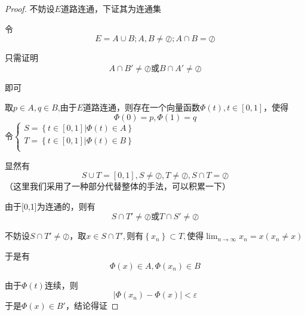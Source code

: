 \documentclass[lang=cn,10pt]{elegantbook}
\begin{document}
	\begin{proof}
		
		不妨设$E$道路连通，下证其为连通集
		
		令\begin{equation*}
			E=A\cup B;A,B\ne \oslash ;A\cap B=\oslash 
		\end{equation*}
		
		只需证明
		\begin{equation*}
			A\cap B'\ne\oslash\text{或}B\cap A'\ne\oslash
		\end{equation*}
		
		即可
		
		取$p\in A,q\in B$,由于$E$道路连通，则存在一个向量函数$\Phi \left( t \right) ,t\in \left[ 0,1 \right] $，使得
		\begin{equation*}
			\Phi \left( 0 \right)=p,\Phi \left( 1 \right)=q
		\end{equation*}
		令$\begin{cases}
			S=\left\{ t\in \left[ 0,1 \right] |\Phi \left( t \right) \in A \right\}\\
			T=\left\{ t\in \left[ 0,1 \right] |\Phi \left( t \right) \in B \right\}\\
		\end{cases}$
		
		显然有
		\begin{equation*}
			S\cup T=\left[ 0,1 \right] ,S\ne \oslash ,T\ne \oslash ,S\cap T=\oslash 
		\end{equation*}
		（这里我们采用了一种部分代替整体的手法，可以积累一下）
		
		由于[0,1]为连通的，则有
		\begin{equation*}
			S\cap T'\ne\oslash\text{或}T\cap S'\ne\oslash
		\end{equation*}
		
		不妨设$S\cap T'\ne \oslash \text{，取}x\in S\cap T',\text{则有}\left\{ x_n \right\} \subset T,\text{使得}\lim_{n\rightarrow \infty} x_n=x\left( x_n\ne x \right)$ 
		
		于是有
		\begin{equation*}
			\Phi \left( x \right)\in A,\Phi \left( x_{n} \right)\in B
		\end{equation*}
		
		由于$\Phi \left( t \right)$连续，则
		\begin{equation*}
			|\Phi\left( x_{n} \right)-\Phi \left( x \right)|<\varepsilon
		\end{equation*}
		于是$\Phi \left( x \right)\in B'$，结论得证
	\end{proof}
\end{document}
